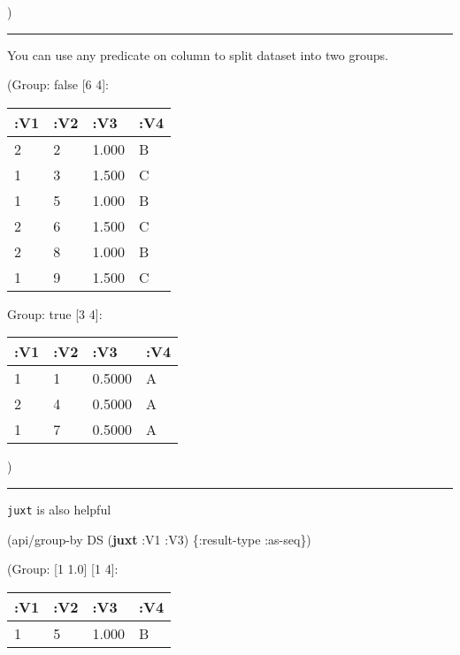 \documentclass[]{article}
\newenvironment{Shaded}{\begin{snugshade}}{\end{snugshade}}
\newcommand{\KeywordTok}[1]{\textcolor[rgb]{0.13,0.29,0.53}{\textbf{#1}}}
\newcommand{\FloatTok}[1]{\textcolor[rgb]{0.00,0.00,0.81}{#1}}
\newcommand{\VariableTok}[1]{\textcolor[rgb]{0.00,0.00,0.00}{#1}}
\newcommand{\AttributeTok}[1]{\textcolor[rgb]{0.77,0.63,0.00}{#1}}
\newcommand{\NormalTok}[1]{#1}
\begin{document}
)

\begin{center}\rule{0.5\linewidth}{0.5pt}\end{center}

You can use any predicate on column to split dataset into two groups.

\begin{Shaded}
\end{Shaded}

(Group: false {[}6 4{]}:

\begin{longtable}[]{@{}llll@{}}
\toprule
:V1 & :V2 & :V3 & :V4\tabularnewline
\midrule
\endhead
2 & 2 & 1.000 & B\tabularnewline
1 & 3 & 1.500 & C\tabularnewline
1 & 5 & 1.000 & B\tabularnewline
2 & 6 & 1.500 & C\tabularnewline
2 & 8 & 1.000 & B\tabularnewline
1 & 9 & 1.500 & C\tabularnewline
\bottomrule
\end{longtable}

Group: true {[}3 4{]}:

\begin{longtable}[]{@{}llll@{}}
\toprule
:V1 & :V2 & :V3 & :V4\tabularnewline
\midrule
\endhead
1 & 1 & 0.5000 & A\tabularnewline
2 & 4 & 0.5000 & A\tabularnewline
1 & 7 & 0.5000 & A\tabularnewline
\bottomrule
\end{longtable}

)

\begin{center}\rule{0.5\linewidth}{0.5pt}\end{center}

\texttt{juxt} is also helpful

\begin{Shaded}
\begin{Highlighting}[]
\NormalTok{(api/group-by DS (}\KeywordTok{juxt} \AttributeTok{:V1} \AttributeTok{:V3}\NormalTok{) \{}\AttributeTok{:result-type} \AttributeTok{:as-seq}\NormalTok{\})}
\end{Highlighting}
\end{Shaded}

(Group: {[}1 1.0{]} {[}1 4{]}:

\begin{longtable}[]{@{}llll@{}}
\toprule
:V1 & :V2 & :V3 & :V4\tabularnewline
\midrule
\endhead
1 & 5 & 1.000 & B\tabularnewline
\bottomrule
\end{longtable}
\end{document}
